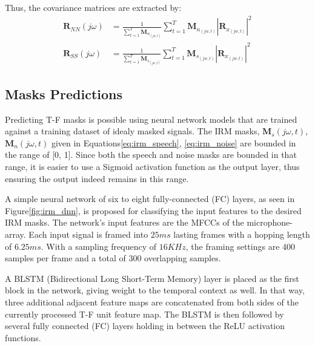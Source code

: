 %
Thus, the covariance matrices are extracted by:
\begin{align}
    \mathbf{R}_{NN}(j\omega) & = \frac{1}{\sum\limits_{t=1}^{T}\mathbf{M}_{n_{(jw, t)}}}\sum_{t=1}^{T}\mathbf{M}_{n_{(jw, t)}}|\mathbf{R}_{x_{(jw, t)}}|^2\\
    \mathbf{R}_{SS}(j\omega) & = \frac{1}{\sum\limits_{t=1}^{T}\mathbf{M}_{s_{(jw, t)}}}\sum_{t=1}^{T}\mathbf{M}_{s_{(jw, t)}}|\mathbf{R}_{x_{(jw, t)}}|^2
\end{align}

\subsection{Masks Predictions}
Predicting T-F masks is possible using neural network models that are
trained against a training dataset of idealy masked signals.
The IRM masks, \(\mathbf{M}_{s}(j\omega, t)\), \(\mathbf{M}_{n}(j\omega, t)\)
given in Equations\;\ref{eq:irm_speech}, \ref{eq:irm_noise} are bounded
in the range of [0, 1]. 
Since both the speech and noise masks are bounded in that range, it is easier
to use a Sigmoid activation function
as the output layer, 
thus ensuring the output indeed remains in this range.

A simple neural network of six to eight fully-connected (FC) layers,
as seen in Figure\;\ref{fig:irm_dnn}, is proposed for
classifying the input features to the desired IRM masks.
The network's input features are the MFCCs of the microphone-array.
Each input signal is framed into \(25ms\) lasting frames with a
hopping length of \(6.25ms\). With a sampling frequency of \(16KHz\), 
the framing settings are 400 samples per frame and 
a total of 300 overlapping samples. 

A BLSTM (Bidirectional Long Short-Term Memory)
layer is placed as the first block in the network,
giving weight to the temporal context as well.
In that way, three additional adjacent feature maps 
are concatenated from both sides of the currently 
processed T-F unit feature map.
The BLSTM is then followed 
by several fully connected (FC) layers 
holding in between the ReLU activation functions.

